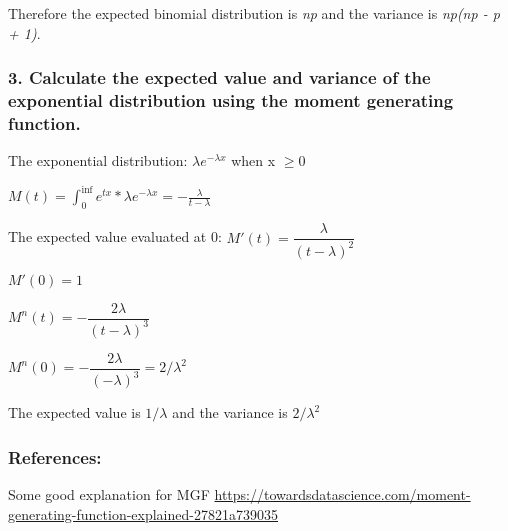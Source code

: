 \documentclass[
]{article}
\begin{document}
Therefore the expected binomial distribution is \emph{np} and the
variance is \emph{np(np - p + 1)}.

\hypertarget{calculate-the-expected-value-and-variance-of-the-exponential-distribution-using-the-moment-generating-function.}{%
\subsubsection{3. Calculate the expected value and variance of the
exponential distribution using the moment generating
function.}\label{calculate-the-expected-value-and-variance-of-the-exponential-distribution-using-the-moment-generating-function.}}

The exponential distribution: \(\lambda e^{-\lambda x}\) when x
\(\ge 0\)

\(M(t)=\int^\inf_0e^{tx}*\lambda e^{-\lambda x}=-\frac{\lambda}{t-\lambda}\)

The expected value evaluated at 0:
\(M'(t) = \dfrac{\lambda}{(t-\lambda)^2}\)

\(M'(0) = 1\)

\(M^n(t) = -\dfrac{2\lambda}{(t-\lambda)^3}\)

\(M^n(0) = -\dfrac{2\lambda}{(-\lambda)^3} = 2 / \lambda ^2\)

The expected value is \(1 / \lambda\) and the variance is
\(2 / \lambda ^2\)

\hypertarget{references}{%
\subsubsection{References:}\label{references}}

Some good explanation for MGF
\url{https://towardsdatascience.com/moment-generating-function-explained-27821a739035}
\end{document}
